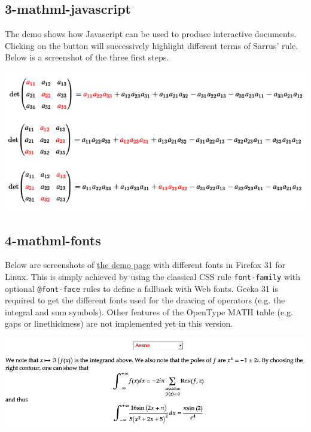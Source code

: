 \subsection{3-mathml-javascript}

The demo shows how Javascript can be used to produce interactive documents.
Clicking on the button will successively highlight different terms of Sarrus'
rule. Below is a screenshot of the three first steps.

\href{http://fred-wang.github.io/MathUI2014/demos/3-mathml-javascript.html}{\includegraphics[width=\textwidth]{screenshots/3-mathml-javascript}}

\subsection{4-mathml-fonts}

Below are screenshots of 
\href{http://fred-wang.github.io/MathUI2014/demos/4-mathml-fonts.html}{the demo page} with different fonts in Firefox 31 for Linux.
This is simply achieved by
using the classical CSS rule {\tt font-family} with optional {\tt @font-face}
rules to define a fallback with Web fonts. Gecko 31 is required to get the
different fonts used for the drawing of operators (e.g. the integral and
sum symbols). Other features of the OpenType MATH table (e.g. gaps or
linethickness) are not implemented yet in this version.

\includegraphics[width=\textwidth]{screenshots/4-mathml-fonts-asana}

